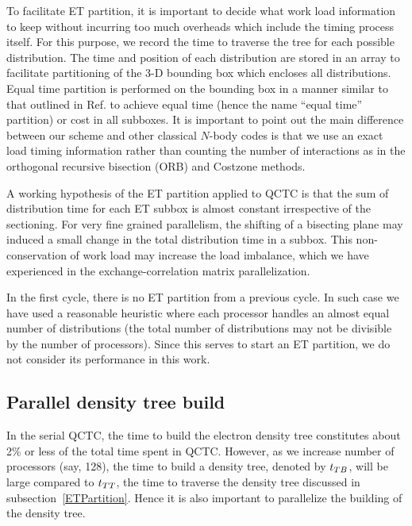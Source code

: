 \commentoutA{\documentclass[prl,aps,twocolumn,twocolumngrid,superbib]{revtex4}}
\begin{document}
To facilitate ET partition, it is important to decide what work load
information to keep without incurring too much overheads which include
the timing process itself.  For this purpose, we record the time to
traverse the tree for each possible distribution. The time and
position of each distribution are stored in an array to facilitate
partitioning of the 3-D bounding box which encloses all
distributions. Equal time partition is performed on the bounding box
in a manner similar to that outlined in Ref.\cite{CGan03} to achieve
equal time (hence the name ``equal time'' partition) or cost in all
subboxes.  It is important to point out the main difference between
our scheme and other classical $N$-body
codes\cite{warren:92_article,Singh93} is that we use an exact load
timing information rather than counting the number of interactions as
in the orthogonal recursive bisection (ORB)\cite{warren:92_article}
and Costzone methods\cite{Singh93}.

A working hypothesis of the ET partition applied to QCTC is that the
sum of distribution time for each ET subbox is almost constant
irrespective of the sectioning. For very fine grained parallelism, the
shifting of a bisecting plane may induced a small change in the total
distribution time in a subbox.  This non-conservation of work load may
increase the load imbalance, which we have experienced in the
exchange-correlation matrix parallelization\cite{CGan03}.

In the first cycle, there is no ET partition from a previous cycle. In
such case we have used a reasonable heuristic where each processor
handles an almost equal number of distributions (the total number of
distributions may not be divisible by the number of processors). Since
this serves to start an ET partition, we do not consider its
performance in this work.

\subsection{Parallel density tree build} 
\label{sec:parallelTB}
In the serial QCTC, the time to build the electron density tree
constitutes about 2\% or less of the total time spent in
QCTC. However, as we increase number of processors (say, 128), the
time to build a density tree, denoted by $t_{TB}$, will be large
compared to $t_{TT}$, the time to traverse the density tree discussed in
subsection~\ref{ETPartition}.  Hence it is also important to
parallelize the building of the density tree.
\end{document}

